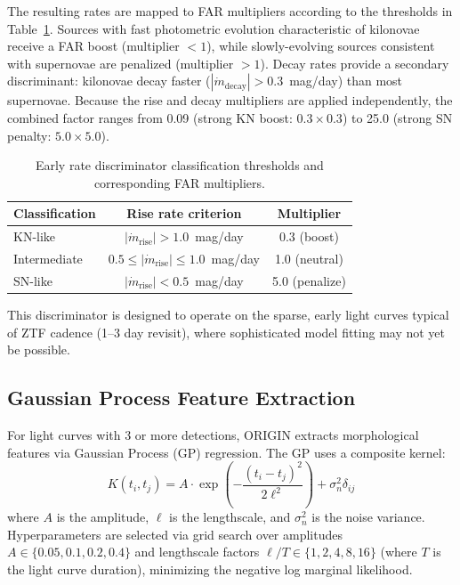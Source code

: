 \documentclass[twocolumn]{article}
\begin{document}
The resulting rates are mapped to FAR multipliers according to the thresholds in Table~\ref{tab:earlyrate}. Sources with fast photometric evolution characteristic of kilonovae receive a FAR boost (multiplier $< 1$), while slowly-evolving sources consistent with supernovae are penalized (multiplier $> 1$). Decay rates provide a secondary discriminant: kilonovae decay faster ($|\dot{m}_\mathrm{decay}| > 0.3$~mag/day) than most supernovae. Because the rise and decay multipliers are applied independently, the combined factor ranges from 0.09 (strong KN boost: $0.3 \times 0.3$) to 25.0 (strong SN penalty: $5.0 \times 5.0$).

\begin{table}[htbp]
\centering
\caption{Early rate discriminator classification thresholds and corresponding FAR multipliers. \label{tab:earlyrate}}
\begin{tabular}{lcc}
\toprule
Classification & Rise rate criterion & Multiplier \\
\midrule
KN-like      & $|\dot{m}_\mathrm{rise}| > 1.0$~mag/day & 0.3 (boost) \\
Intermediate & $0.5 \leq |\dot{m}_\mathrm{rise}| \leq 1.0$~mag/day & 1.0 (neutral) \\
SN-like      & $|\dot{m}_\mathrm{rise}| < 0.5$~mag/day & 5.0 (penalize) \\
\bottomrule
\end{tabular}
\end{table}

This discriminator is designed to operate on the sparse, early light curves typical of ZTF cadence (1--3 day revisit), where sophisticated model fitting may not yet be possible.

\subsection{Gaussian Process Feature Extraction} \label{sec:gp}

For light curves with 3 or more detections, ORIGIN extracts morphological features via Gaussian Process (GP) regression. The GP uses a composite kernel:
\begin{equation} \label{eq:gpkernel}
    K(t_i, t_j) = A \cdot \exp\!\left(-\frac{(t_i - t_j)^2}{2\ell^2}\right) + \sigma_n^2 \delta_{ij}
\end{equation}
where $A$ is the amplitude, $\ell$ is the lengthscale, and $\sigma_n^2$ is the noise variance. Hyperparameters are selected via grid search over amplitudes $A \in \{0.05, 0.1, 0.2, 0.4\}$ and lengthscale factors $\ell/T \in \{1, 2, 4, 8, 16\}$ (where $T$ is the light curve duration), minimizing the negative log marginal likelihood.
\end{document}
